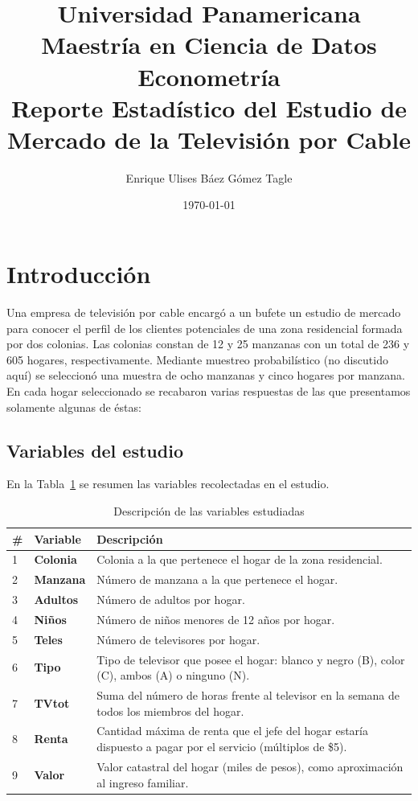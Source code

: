 \documentclass[10pt]{article}
\title{Universidad Panamericana \\ Maestría en Ciencia de Datos \\ Econometría \\ \vspace{0.5cm} Reporte Estadístico del Estudio de Mercado de la Televisión por Cable}
\author{Enrique Ulises Báez Gómez Tagle}
\date{\today}
\begin{document}
\maketitle

\tableofcontents

\newpage

\section{Introducción}
Una empresa de televisión por cable encargó a un bufete un estudio de mercado para conocer el perfil de los clientes potenciales de una zona residencial formada por dos colonias. Las colonias constan de 12 y 25 manzanas con un total de 236 y 605 hogares, respectivamente. Mediante muestreo probabilístico (no discutido aquí) se seleccionó una muestra de ocho manzanas y cinco hogares por manzana. En cada hogar seleccionado se recabaron varias respuestas de las que presentamos solamente algunas de éstas:

\subsection{Variables del estudio}
En la Tabla~\ref{tab:variables_descripcion} se resumen las variables recolectadas en el estudio.

\begin{table}[H]
    \centering
    \caption{Descripción de las variables estudiadas}
    \label{tab:variables_descripcion}
    \begin{tabular}{llp{8cm}}
        \hline
        \# & Variable & Descripción \\ \hline
        1 & \textbf{Colonia} & Colonia a la que pertenece el hogar de la zona residencial. \\
        2 & \textbf{Manzana} & Número de manzana a la que pertenece el hogar. \\
        3 & \textbf{Adultos} & Número de adultos por hogar. \\
        4 & \textbf{Niños} & Número de niños menores de 12 años por hogar. \\
        5 & \textbf{Teles} & Número de televisores por hogar. \\
        6 & \textbf{Tipo} & Tipo de televisor que posee el hogar: blanco y negro (B), color (C), ambos (A) o ninguno (N). \\
        7 & \textbf{TVtot} & Suma del número de horas frente al televisor en la semana de todos los miembros del hogar. \\
        8 & \textbf{Renta} & Cantidad máxima de renta que el jefe del hogar estaría dispuesto a pagar por el servicio (múltiplos de \$5). \\
        9 & \textbf{Valor} & Valor catastral del hogar (miles de pesos), como aproximación al ingreso familiar. \\
        \hline
    \end{tabular}
\end{table}
\end{document}
